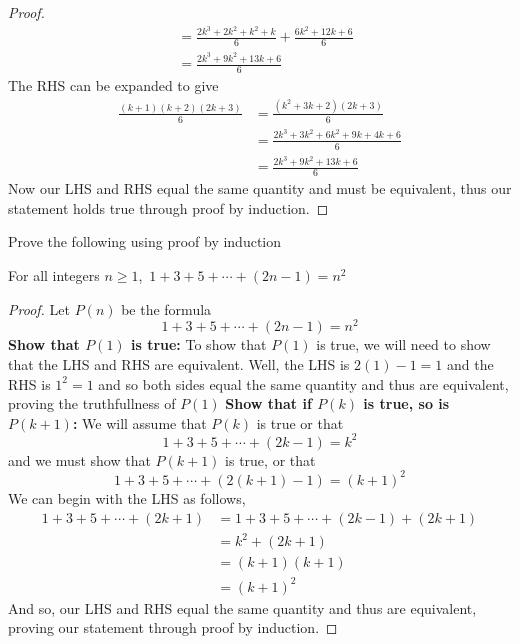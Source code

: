 \documentclass[addpoints]{exam}
\begin{document}
\begin{questions}
\begin{solution}[\stretch{1}]
\begin{proof}
\begin{align*}
				                                         & = \frac{2k^3 + 2k^2 + k^2 + k}{6} + \frac{6k^2 + 12k + 6}{6} \\
				                                         & = \frac{2k^3 + 9k^2 + 13k + 6}{6}
			\end{align*}
			The RHS can be expanded to give
			\begin{align*}
				\frac{(k+1)(k+2)(2k+3)}{6} & = \frac{(k^2 + 3k + 2)(2k+3)}{6}             \\
				                           & = \frac{2k^3 + 3k^2 + 6k^2 + 9k + 4k + 6}{6} \\
				                           & = \frac{2k^3 + 9k^2 + 13k + 6}{6}
			\end{align*}
			Now our LHS and RHS equal the same quantity and must be equivalent, thus our statement holds true through proof by induction.
		\end{proof}
	\end{solution}

	\newpage

	\question Prove the following using proof by induction
	\begin{center}
		For all integers $n \geq 1$, $\displaystyle\, 1 + 3 + 5 + \cdots + (2n-1) = n^2$
	\end{center}
	\begin{solution}[\stretch{1}]
		\begin{proof}
			Let $P(n)$ be the formula
			\[
				1 + 3 + 5 + \cdots + (2n-1) = n^2
			\]
			\textbf{Show that $P(1)$ is true:} To show that $P(1)$ is true, we will need to show that the LHS and RHS are equivalent. Well, the LHS is $2(1)-1=1$ and the RHS is $1^2=1$ and so both sides equal the same quantity and thus are equivalent, proving the truthfullness of $P(1)$
			\newline\textbf{Show that if $P(k)$ is true, so is $P(k+1)$:} We will assume that $P(k)$ is true or that
			\[
				1 + 3 + 5 + \cdots + (2k-1) = k^2
			\]
			and we must show that $P(k+1)$ is true, or that
			\[
				1 + 3 + 5 + \cdots + \left(2\left(k+1\right)-1\right) = \left(k+1\right)^2
			\]
			We can begin with the LHS as follows,
			\begin{align*}
				1 + 3 + 5 + \cdots + (2k + 1) & = 1 + 3 + 5 + \cdots + (2k - 1) + (2k + 1) \\
				                              & = k^2 + (2k + 1)                           \\
				                              & = (k+1)(k+1)                               \\
				                              & = \left(k+1\right)^2
			\end{align*}
			And so, our LHS and RHS equal the same quantity and thus are equivalent, proving our statement through proof by induction.
		\end{proof}
	\end{solution}


\end{questions}
\end{document}
